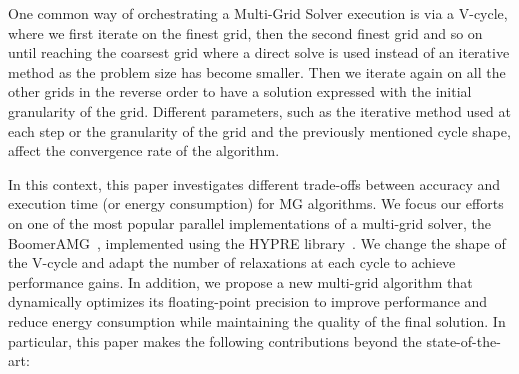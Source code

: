One common way of orchestrating a Multi-Grid Solver execution is via a V-cycle,
where we first iterate on the finest grid, then the second finest grid and so
on until reaching the coarsest grid where a direct solve is used instead of an
iterative method as the problem size has become smaller.  Then we iterate again
on all the other grids in the reverse order to have a solution expressed with
the initial granularity of the grid.  Different parameters, such as the iterative
method used at each step or the granularity of the grid and the previously
mentioned cycle shape, affect the convergence rate of the algorithm.


In this context, this paper investigates different trade-offs between accuracy
and execution time (or energy consumption) for MG algorithms. We focus our
efforts on one of the most popular parallel implementations of a multi-grid
solver, the BoomerAMG~\cite{boomerAMG}, implemented using the HYPRE
library~\cite{Falgout2002}. We change the shape of the V-cycle and adapt the
number of relaxations at each cycle to achieve performance gains. In addition, we propose a
new multi-grid algorithm that dynamically optimizes its floating-point precision to
improve performance and reduce energy consumption while maintaining
the quality of the final solution. In particular, this paper makes the following contributions
beyond the state-of-the-art:

